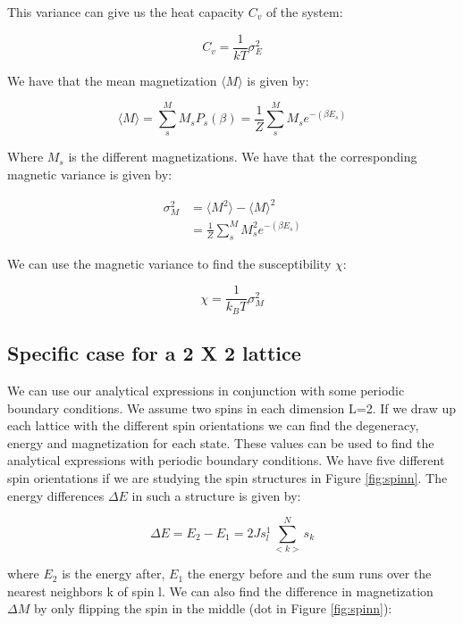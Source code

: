 \documentclass{article}
\begin{document}
\begin{multicols}{2}
This variance can give us the heat capacity $C_v$ of the system:

\begin{equation}
C_v = \frac{1}{kT} \sigma_E^2 
\label{eq:C_v}
\end{equation}

We have that the mean magnetization $\langle M \rangle$ is given by:

\begin{equation}
\langle M \rangle=\sum_s^M M_s P_s(\beta)=\frac{1}{Z}\sum_s^M M_s e^{-(\beta E_s)}
\label{eq:mM}
\end{equation}

Where $M_s$ is the different magnetizations. We have that the corresponding magnetic variance is given by:

\begin{equation}
\begin{split}
\sigma_M^2&=\langle M^2 \rangle-\langle M \rangle^2 \\
& = \frac{1}{Z}\sum_s^M M_s^2 e^{-(\beta E_s)}
\end{split}
\label{eq:M_v}
\end{equation}

We can use the magnetic variance to find the susceptibility $\chi$:

\begin{equation}
\chi = \frac{1}{k_BT}\sigma_M^2
\label{eq:chi}
\end{equation}

\subsection*{Specific case for a 2 X 2 lattice}

We can use our analytical expressions in conjunction with some periodic boundary conditions. We assume two spins in each dimension L=2. If we draw up each lattice with the different spin orientations we can find the degeneracy, energy and magnetization for each state. These values can be used to find the analytical expressions with periodic boundary conditions. We have five different spin orientations if we are studying the spin structures in Figure \ref{fig:spinn}. The energy differences $\Delta E$ in such a structure is given by:

\begin{equation}
\Delta E = E_2 - E_1 =  2J s_l^1\sum_{<k>}^N s_k
\label{eq:dE}
\end{equation}

where $E_2$ is the energy after, $E_1$ the energy before and the sum runs  over the nearest neighbors k of spin l. We can also find the difference in magnetization $\Delta M$ by only flipping the spin in the middle (dot in Figure \ref{fig:spinn}):


\end{multicols}
\end{document}
